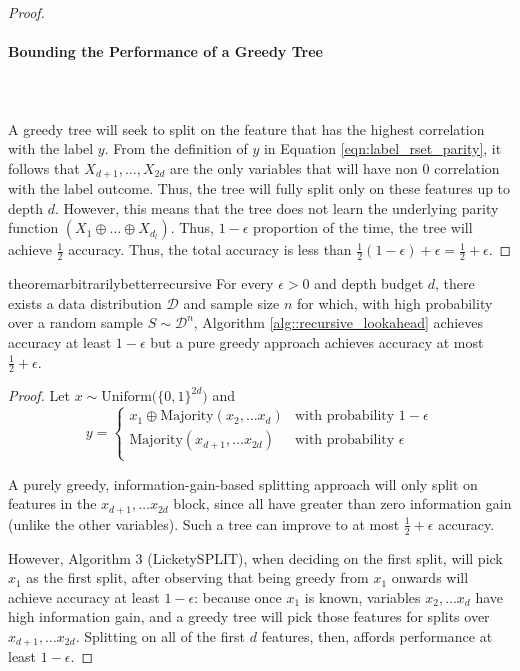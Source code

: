 \begin{proof}
\paragraph{Bounding the Performance of a Greedy Tree}\leavevmode\\\\
A greedy tree will seek to split on the feature that has the highest correlation with the label $y$. From the definition of $y$ in Equation \ref{eqn:label_rset_parity}, it follows that $X_{d+1},\ldots, X_{2d}$ are the only variables that will have non $0$ correlation with the label outcome. Thus, the tree will fully split only on these features up to depth $d$. However, this means that the tree does not learn the underlying parity function $(X_1 \oplus \ldots\oplus X_{d_l})$. Thus, $1-\epsilon$ proportion of the time, the tree will achieve $\frac{1}{2}$ accuracy. Thus, the total accuracy is less than $\frac{1}{2}(1-\epsilon) + \epsilon = \frac{1}{2} + \epsilon$. 
\end{proof}

\begin{restatable}{theorem}{arbitrarilybetterrecursive}
    \label{thm::arbitrarily_better_recursive}
    For every $\epsilon > 0$ and depth budget $d$, there exists a data distribution $\mathcal{D}$ and sample size $n$ for which, with high probability over a random sample $S \sim \mathcal{D}^n$, Algorithm \ref{alg::recursive_lookahead} achieves accuracy at least $1-\epsilon$ but a pure greedy approach achieves accuracy at most $\frac{1}{2} + \epsilon$.
\end{restatable}

\begin{proof}

Let 
$x \sim \textrm{Uniform}\big(\{0,1\}^{2d}\big)$ and
$$y = \begin{cases}
    x_1 \oplus \textrm{Majority}(x_2, \ldots x_d) & \textrm{with probability $1 - \epsilon$}\\
    \textrm{Majority}(x_{d+1}, \ldots x_{2d}) & \textrm{with probability $\epsilon$}\\
\end{cases}$$

A purely greedy, information-gain-based splitting approach will only split on features in the $x_{d+1}, \ldots x_{2d}$ block, since all have greater than zero information gain (unlike the other variables). Such a tree can improve to at most $\frac{1}{2} + \epsilon$ accuracy. 
 
However, Algorithm 3 (LicketySPLIT), when deciding on the first split, will pick $x_1$ as the first split, after observing that being greedy from $x_1$ onwards will achieve accuracy at least $1-\epsilon$: because once $x_1$ is known, variables $x_2, \ldots x_d$ have high information gain, and a greedy tree will pick those features for splits over $x_{d+1}, \ldots x_{2d}$. Splitting on all of the first $d$ features, then, affords performance at least $1 - \epsilon$. 

\end{proof}